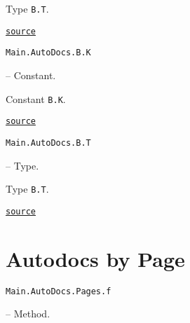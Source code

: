 \begin{adjustwidth}{2em}{0pt}

Type \texttt{B.T}.



\href{https://github.com/BambOoxX/Documenter.jl/blob/d157febde213549ed0d45c894f0651560da477d3/test/examples/make.jl#L106}{\texttt{source}}


\end{adjustwidth}
\hypertarget{3291598769099158785}{\texttt{Main.AutoDocs.B.K}}  -- {Constant.}

\begin{adjustwidth}{2em}{0pt}

Constant \texttt{B.K}.



\href{https://github.com/BambOoxX/Documenter.jl/blob/d157febde213549ed0d45c894f0651560da477d3/test/examples/make.jl#L118}{\texttt{source}}


\end{adjustwidth}
\hypertarget{16943270388934614325}{\texttt{Main.AutoDocs.B.T}}  -- {Type.}

\begin{adjustwidth}{2em}{0pt}

Type \texttt{B.T}.



\href{https://github.com/BambOoxX/Documenter.jl/blob/d157febde213549ed0d45c894f0651560da477d3/test/examples/make.jl#L121}{\texttt{source}}


\end{adjustwidth}

\section{Autodocs by Page}



\label{17012311511907355869}{}

\hypertarget{16694402067483188119}{\texttt{Main.AutoDocs.Pages.f}}  -- {Method.}

